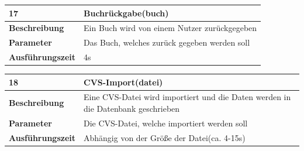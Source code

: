 \documentclass[fontsize=12pt,paper=a4,twoside]{scrartcl}
\begin{document}
\begin{table}
	[H] \label{a17} 
	\begin{tabular}
		{|l|p{10cm}|} \hline \textbf{17} & \textbf{Buchrückgabe(buch)} \\
		\hline \textbf{Beschreibung} & Ein Buch wird von einem Nutzer zurückgegeben\\
		\hline \textbf{Parameter} & Das Buch, welches zurück gegeben werden soll \\
		\hline \textbf{Ausführungszeit} & 4s\\
		\hline 
	\end{tabular}
\end{table}
\begin{table}
	[H] \label{a18} 
	\begin{tabular}
		{|l|p{10cm}|} \hline \textbf{18} & \textbf{CVS-Import(datei)} \\
		\hline \textbf{Beschreibung} & Eine CVS-Datei wird importiert und die Daten werden in die Datenbank geschrieben\\
		\hline \textbf{Parameter} & Die CVS-Datei, welche importiert werden soll \\
		\hline \textbf{Ausführungszeit} & Abhängig von der Größe der Datei(ca. 4-15s)\\
		\hline 
	\end{tabular}
\end{table}
\end{document}
